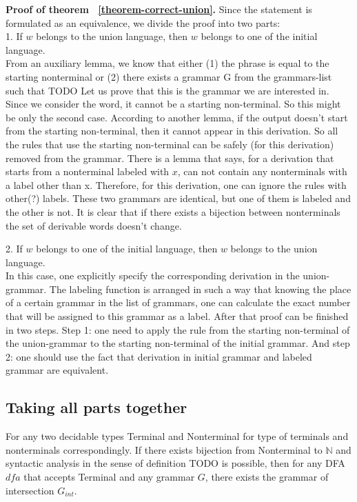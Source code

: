 \textbf{Proof of theorem ~\ref{theorem-correct-union}.} Since the statement is formulated as an equivalence, we divide the proof into two parts:\\
1. If $w$ belongs to the union language, then $w$ belongs to one of the initial language. \\
From an auxiliary lemma, we know that either (1) the phrase is equal to the starting nonterminal or (2) there exists a grammar G from the grammars-list such that TODO
Let us prove that this is the grammar we are interested in.
Since we consider the word, it cannot be a starting non-terminal. So this might be only the second case.
According to another lemma, if the output doesn't start from the starting non-terminal, then it cannot appear in this derivation. So all the rules that use the starting non-terminal can be safely (for this derivation) removed from the grammar.
There is a lemma that says, for a derivation that starts from a nonterminal labeled with $x$, can not contain any nonterminals with a label other than x. Therefore, for this derivation, one can ignore the rules with other(?) labels.
These two grammars are identical, but one of them is labeled and the other is not. It is clear that if there exists a bijection between nonterminals the set of derivable words doesn't change.

2. If $w$ belongs to one of the initial language, then $w$ belongs to the union language. \\
In this case, one explicitly specify the corresponding derivation in the union-grammar.
The labeling function is arranged in such a way that knowing the place of a certain grammar in the list of grammars, one can calculate the exact number that will be assigned to this grammar as a label.
After that proof can be finished in two steps. Step 1: one need to apply the rule from the starting non-terminal of the union-grammar to the starting non-terminal of the initial grammar. And step 2: one should use the fact that derivation in initial grammar and labeled grammar are equivalent.

\subsection{Taking all parts together}



\begin{theorem}
    For any two decidable types Terminal and Nonterminal for type of terminals and nonterminals correspondingly. If there exists bijection from Nonterminal to $\mathbb{N}$ and syntactic analysis in the sense of definition TODO is possible, then for any DFA $dfa$ that accepts Terminal and any grammar $G$, there exists the grammar of intersection $G_{int}$.
\end{theorem}   

